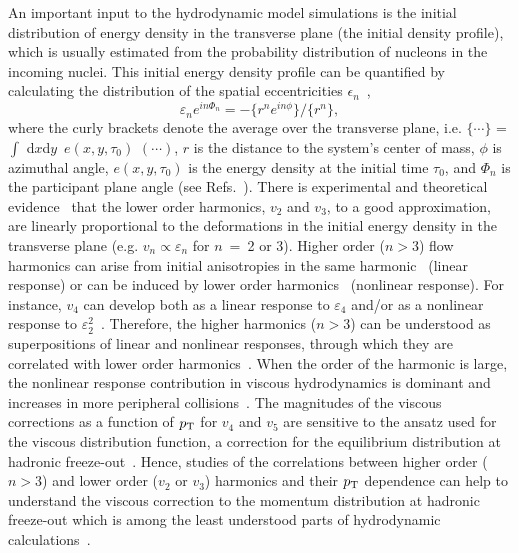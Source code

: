 An important input to the hydrodynamic model simulations is the initial distribution of energy density in the transverse plane (the initial density profile), which is usually estimated from the probability distribution of nucleons in the incoming nuclei.
This initial energy density profile can be quantified by calculating the distribution of the spatial eccentricities $\epsilon_n$~\cite{Alver:2010gr},
\begin{equation}
 \varepsilon_{n} e^{in\Phi_{n}} = -\{r^n e^{in\phi}\}/ \{r^n\},
  \label{eq:eccentricities}
\end{equation}
where the curly brackets denote the average over the transverse plane, i.e. $\{\cdots\}$ = $\int$ d$x$d$y$\, $e(x,y,\tau_0)$ $(\cdots)$, $r$ is the distance to the system's center of mass, $\phi$ is azimuthal angle, $e(x,y,\tau_0)$ is the energy density at the initial time $\tau_0$, and $\Phi_{n}$ is the participant plane angle (see Refs.~\cite{Teaney:2010vd,Niemi:2015qia}).
There is experimental and theoretical evidence~\cite{Alver:2010gr,Qiu:2011iv,ALICE:2011ab} that the lower order harmonics, $v_2$ and $v_3$, to a good approximation, are linearly proportional to the deformations in the initial energy density in the transverse plane (e.g. $v_n \propto \varepsilon_n$ for $n~=~$2 or 3).
Higher order ($n > 3$) flow harmonics can arise from initial anisotropies in the same harmonic~\cite{Alver:2010gr,Teaney:2010vd,Gubser:2010ui,Hatta:2014jva} (linear response) or can be induced by lower order harmonics~\cite{Bravina:2013xla,Bravina:2013ora} (nonlinear response).
For instance, $v_4$ can develop both as a linear response to $\varepsilon_4$ and/or as a nonlinear response to $\varepsilon_2^2$~\cite{Gardim:2011xv}.
Therefore, the higher harmonics ($n > 3$) can be understood as superpositions of linear and nonlinear responses, through which they are correlated with lower order harmonics~\cite{Teaney:2012ke,Bravina:2013ora,Gubser:2010ui,Hatta:2014jva,Acharya:2017zfg}. When the order of the harmonic is large, the nonlinear response contribution in viscous hydrodynamics is dominant and increases in more peripheral collisions~\cite{Teaney:2012ke,Bravina:2013ora}.
The magnitudes of the viscous corrections as a function of $p_{\rm T}$ for $v_4$ and $v_5$ are sensitive to the ansatz used for the viscous distribution function, a correction for the equilibrium distribution at hadronic freeze-out~\cite{Luzum:2010ad,Teaney:2012ke}.
Hence, studies of the correlations between higher order ($n>3$) and lower order ($v_2$ or $v_3$) harmonics and their $p_{\rm T}$ dependence can help to understand the viscous correction to the momentum distribution at hadronic freeze-out which is among the least understood parts of hydrodynamic calculations~\cite{Dusling:2009df,Teaney:2012ke,Molnar:2014fva,Niemi:2015qia}.

